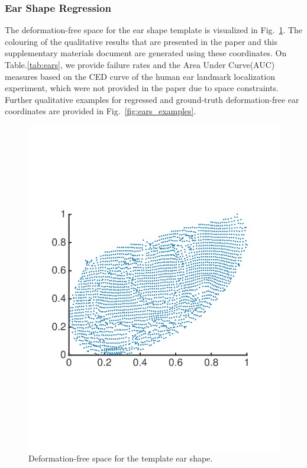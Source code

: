 \subsubsection{Ear Shape Regression}

The deformation-free space for the ear shape template is visualized in Fig.~\ref{fig:earpoints}. The colouring of the qualitative results that are presented in the paper and this supplementary materials document are generated using these coordinates. On Table.\ref{tab:ears}, we provide failure rates and the Area Under Curve(AUC) measures based on the CED curve of the human ear landmark localization experiment, which were not provided in the paper due to space constraints. Further qualitative examples for regressed and ground-truth deformation-free ear coordinates are provided in Fig.~\ref{fig:ears_examples}.


\begin{figure}[h]
\centering
  \includegraphics[trim={3.1cm 8cm 0.35cm 7.3cm},width=0.7\linewidth]{Figures/EarPoints}
\caption{ Deformation-free space for the template ear shape. }
\label{fig:earpoints}
\end{figure}


